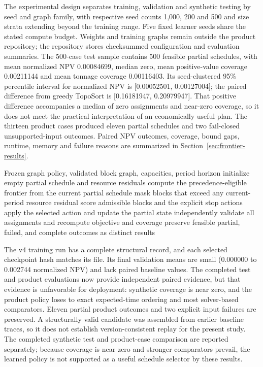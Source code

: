 The experimental design separates training, validation and synthetic testing by seed and graph family, with respective seed counts 1,000, 200 and 500 and size strata extending beyond the training range. Five fixed learner seeds share the stated compute budget. Weights and training graphs remain outside the product repository; the repository stores checksummed configuration and evaluation summaries. The 500-case test sample contains 500 feasible partial schedules, with mean normalized NPV 0.00084699, median zero, mean positive-value coverage 0.00211144 and mean tonnage coverage 0.00116403. Its seed-clustered 95\% percentile interval for normalized NPV is [0.00052501, 0.00127004]; the paired difference from greedy TopoSort is [0.16181947, 0.20979947]. That positive difference accompanies a median of zero assignments and near-zero coverage, so it does not meet the practical interpretation of an economically useful plan. The thirteen product cases produced eleven partial schedules and two fail-closed unsupported-input outcomes. Paired NPV outcomes, coverage, bound gaps, runtime, memory and failure reasons are summarized in Section~\ref{sec:frontier-results}.

\begin{algorithm}
\caption{Masked frontier schedule generation}
\label{alg:frontier}
\begin{algorithmic}[1]
\Require Frozen graph policy, validated block graph, capacities, period horizon
\State initialize empty partial schedule and resource residuals
  \State compute the precedence-eligible frontier from the current partial schedule
  \State mask blocks that exceed any current-period resource residual
  \State score admissible blocks and the explicit stop actions
  \State apply the selected action and update the partial state
\EndWhile
\State independently validate all assignments and recompute objective and coverage
\State preserve feasible partial, failed, and complete outcomes as distinct results
\end{algorithmic}
\end{algorithm}

The v4 training run has a complete structural record, and each selected checkpoint hash matches its file. Its final validation means are small (0.000000 to 0.002744 normalized NPV) and lack paired baseline values. The completed test and product evaluations now provide independent paired evidence, but that evidence is unfavorable for deployment: synthetic coverage is near zero, and the product policy loses to exact expected-time ordering and most solver-based comparators. Eleven partial product outcomes and two explicit input failures are preserved. A structurally valid candidate was assembled from earlier baseline traces, so it does not establish version-consistent replay for the present study. The completed synthetic test and product-case comparison are reported separately; because coverage is near zero and stronger comparators prevail, the learned policy is not supported as a useful schedule selector by these results.

